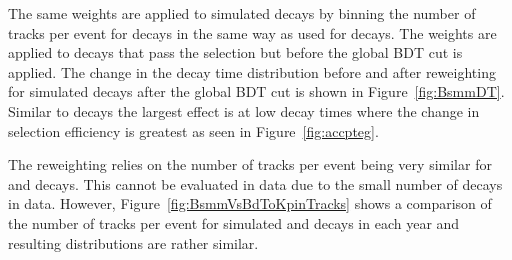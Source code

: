 The same weights are applied to simulated \bsmumu decays by binning the number of tracks per event for \bsmumu decays in the same way as used for \bdkpi decays. The weights are applied to decays that pass the selection but before the global BDT cut is applied. The change in the decay time distribution before and after reweighting for \bsmuu simulated decays after the global BDT cut is shown in Figure~\ref{fig:BsmmDT}. %
Similar to \bdkpi decays the largest effect is at low decay times where the change in selection efficiency is greatest as seen in Figure~\ref{fig:accpteg}.

The reweighting relies on the number of tracks per event being very similar for \bdkpi and \bsmumu decays. This cannot be evaluated in data due to the small number of \bsmumu decays in data. However, Figure~\ref{fig:BsmmVsBdToKpinTracks} shows a comparison of the number of tracks per event for simulated \bsmumu and \bdkpi decays in each year and resulting distributions are rather similar.



